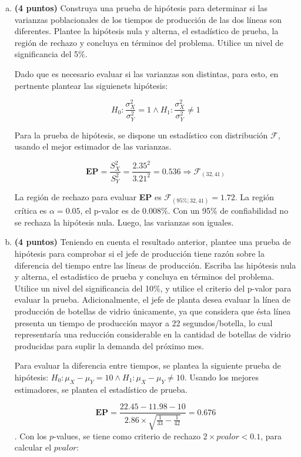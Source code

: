 \documentclass[../main.tex]{subfiles}
\begin{document}
\begin{enumerate}[(a)]

\item \textbf{(4 puntos)} Construya una prueba de hipótesis para determinar si las varianzas
poblacionales de los tiempos de producción de las dos líneas son diferentes. Plantee la
hipótesis nula y alterna, el estadístico de prueba, la región de rechazo y concluya en términos
del problema. Utilice un nivel de significancia del 5\%.

Dado que es necesario evaluar si las varianzas son distintas, para esto, en pertnente plantear las siguienets hipótesis:

$$H_0 : \frac{\sigma_X ^2}{\sigma_Y ^2} = 1 \wedge H_1 : \frac{\sigma_X ^2}{\sigma_Y ^2} \neq 1$$

Para la prueba de hipótesis, se dispone un estadístico con distribución $\mathcal{F}$, usando el mejor estimador de las varianzas.

$$\textbf{EP} = \frac{S_X ^2}{S_Y ^2} = \frac{2.35^2}{3.21^2} = 0.536 \Rightarrow \mathcal{F}_{(32, 41)}$$

La región de rechazo para evaluar \textbf{EP} es $\mathcal{F}_{(95\%; 32, 41)} = 1.72$. La región crítica es $\alpha = 0.05$, el p-valor es de 0.008\%. Con un 95\% de confiabilidad no se rechaza la hipótesis nula. Luego, las varianzas son iguales.

\item \textbf{(4 puntos)} Teniendo en cuenta el resultado anterior, plantee una prueba de hipótesis para comprobar si el jefe de producción tiene razón sobre la diferencia del tiempo entre las líneas de producción. Escriba las hipótesis nula y alterna, el estadístico de prueba y concluya en términos del problema. Utilice un nivel del significancia del 10\%, y utilice el criterio del p-valor para evaluar la prueba. Adicionalmente, el jefe de planta desea evaluar la línea de producción de botellas de vidrio únicamente, ya que considera que ésta línea presenta un tiempo de producción mayor a 22 segundos/botella, lo cual representaría una reducción considerable en la cantidad de botellas de vidrio producidas para suplir la demanda del próximo mes.

Para evaluar la diferencia entre tiempos, se plantea la siguiente prueba de hipótesis:
 $H_0 : \mu_{X} - \mu_{Y} = 10 \wedge H_1 : \mu_{X} - \mu_{Y} \neq 10$. Usando los mejores estimadores, se plantea el estadístico de prueba.
 
 $$\textbf{EP} = \frac{22.45 - 11.98 - 10}{2.86 \times \sqrt{\frac{1}{33} - \frac{1}{42}}} = 0.676 $$. Con los $p$-values, se tiene como criterio de rechazo $2 \times pvalor < 0.1$, para calcular el $pvalor$:
 

\end{enumerate}
\end{document}
